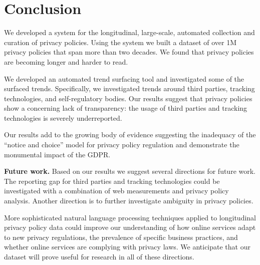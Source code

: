 \section{Conclusion}
\label{sec:conclusion}
We developed a system for the longitudinal, large-scale, automated collection and curation of privacy policies. Using the system we built a dataset of over 1M privacy policies that span more than two decades. We found that privacy policies are becoming longer and harder to read.

We developed an automated trend surfacing tool and investigated some of the surfaced trends. Specifically, we investigated trends around third parties, tracking technologies, and self-regulatory bodies. Our results suggest that privacy policies show a concerning lack of transparency: the usage of third parties and tracking technologies is severely underreported.

Our results add to the growing body of evidence suggesting the inadequacy of the ``notice and choice'' model for privacy policy regulation and demonstrate the monumental impact of the GDPR.






\textbf{Future work.}
Based on our results we suggest several directions for future work. The reporting gap for third parties and tracking technologies could be investigated with a combination of web measurements and privacy policy analysis. Another direction is to further investigate ambiguity in privacy policies.

More sophisticated natural language processing techniques applied to longitudinal privacy policy data could improve our understanding of how online services adapt to new privacy regulations, the prevalence of specific business practices, and whether online services are complying with privacy laws. 
We anticipate that our dataset will prove useful for research in all of these directions.
